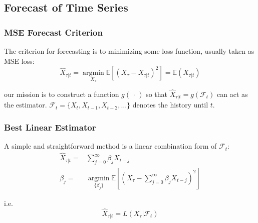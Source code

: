     


    
\subsection{Forecast of Time Series}


\subsubsection{MSE Forecast Criterion}
    The criterion for forecasting is to minimizing some loss function, usually taken as MSE loss:
    \begin{equation}
        \hat{X}_{\tau|t}= \mathop{\arg\min}\limits_{X_\tau} \mathbb{E}[\left( X_\tau-X_{\tau|t} \right)^2]= \mathbb{E}\left( X_{\tau|t} \right) 
    \end{equation}

    our mission is to construct a function $ g(\,\cdot\,) $ so that $ \hat{X}_{\tau|t}=g(\mathscr{F}_{t}) $ can act as the estimator. $ \mathscr{F}_t=\{X_t,X_{t-1},X_{t-2},\ldots\} $ denotes the history until $ t $.

\subsubsection{Best Linear Estimator}
    A simple and straightforward method is a linear combination form of $ \mathscr{F}_t $:
    \begin{align}
        \hat{X}_{\tau|t}=&\sum_{j=0}^\infty \beta _jX_{t-j}\\
        \beta _{j}=&\mathop{\arg\min}\limits_{\{\beta _j\}} \mathbb{E}\left[\left( X_\tau-\sum_{j=0}^\infty \beta _jX_{t-j} \right)^2\right]
    \end{align}

    i.e. 
    \begin{equation}
        \hat{X}_{\tau|t}=L(X_\tau|\mathscr{F}_t) 
    \end{equation}
    
